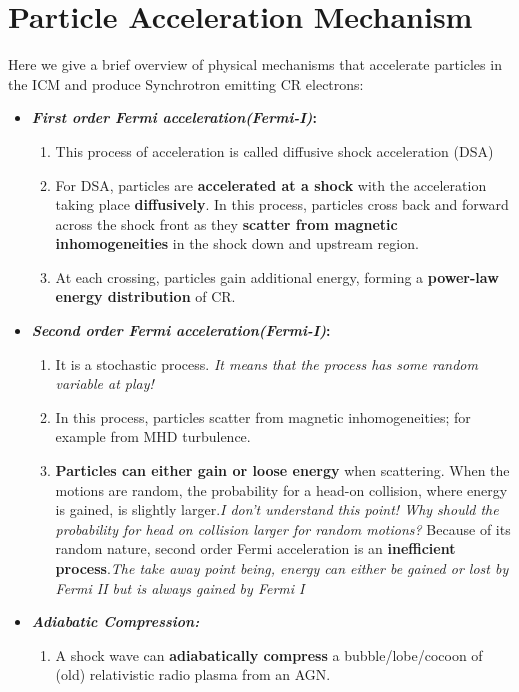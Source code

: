 \documentclass[12pt]{report}
\newcommand{\tbf}[1]{\textbf{#1}}
\newcommand{\tit}[1]{\textit{#1}}
\begin{document}
 \section{Particle Acceleration Mechanism}
 Here we give a brief overview of physical mechanisms that accelerate particles in the ICM and produce Synchrotron emitting CR electrons:
 \begin{itemize}
 
 \item \tbf{\tit{First order Fermi acceleration(Fermi-I)}:}
 \begin{enumerate}
 \item This process of acceleration is called  diffusive shock acceleration (DSA)\\
 \item  For DSA, particles are \tbf{accelerated at a shock} with the acceleration taking place \tbf{diffusively}. In this process, particles cross back and forward across the shock front as they \tbf{scatter from magnetic inhomogeneities} in the shock down and upstream region. 
 \item At each crossing, particles gain additional energy, forming a \tbf{power-law energy distribution} of CR.
 \end{enumerate}
 \item \tbf{\tit{Second order Fermi acceleration(Fermi-I)}:}
 \begin{enumerate}
 \item It is a stochastic process. \tit{It means that the process has some random variable at play!}
 \item In this process, particles scatter from magnetic inhomogeneities; for example from MHD turbulence.
 \item  \textbf{Particles can either gain or loose energy} when scattering. When the motions are random, the probability for a head-on collision, where energy is gained, is slightly larger.\tit{I don't understand this point! Why should the probability for head on collision larger for random motions?} Because of its random nature, second order Fermi acceleration is an \tbf{inefficient process}.\tit{The take away point being, energy can either be gained or lost by Fermi II but is always gained by Fermi I }
 \end{enumerate}
 \item \tit{\tbf{Adiabatic Compression:}}
 \begin{enumerate}
 \item A shock wave can \tbf{adiabatically compress} a bubble/lobe/cocoon of (old) relativistic radio plasma from an AGN.
 

\end{enumerate}
\end{itemize}
\end{document}
